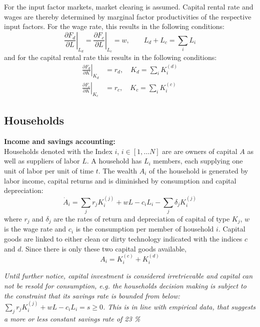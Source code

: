 For the input factor markets, market clearing is assumed. Capital rental rate and wages are thereby determined by marginal factor productivities of the respective input factors.
For the wage rate, this results in the following conditions:
\begin{equation}
	\left. \frac{\partial F_d}{ \partial L} \right|_{L_d} = \left. \frac{\partial F_c}{\partial L}\right|_{L_c} = w, \qquad L_d + L_c = \sum_i L_i
	\label{eq:wage_rage}
\end{equation}
and for the capital rental rate this results in the following conditions:
\begin{align}
	\left. \frac{\partial F_d}{\partial K}\right|_{K_d} &= r_d,\quad K_d = \sum_i K^{(d)}_i \nonumber \\
	\left. \frac{\partial F_c}{\partial K}\right|_{K_c} &= r_c,\quad K_c = \sum_i K^{(c)}_i 
	\label{eq:capital_rental_rate}
\end{align}


\subsection{Households}

\textbf{Income and savings accounting:} \\
Households denoted with the Index $i$, $i \in [1, \dots N]$ are are owners of capital $A$ as well as suppliers of labor $L$. A household has $L_i$ members, each supplying one unit of labor per unit of time $t$. The wealth $A_i$ of the household is generated by labor income, capital returns and is diminished by consumption and capital depreciation:
\begin{equation}
	\dot{A}_i = \sum_j r_j K^{(j)}_{i} + wL -c_{i}L_i - \sum_j \delta_j K^{(j)}_{i}
	\label{eq:household_wealth}
\end{equation}
where $r_j$ and $\delta_j$ are the rates of return and depreciation of capital of type $K_j$, $w$ is the wage rate and $c_i$ is the consumption per member of household $i$. Capital goods are linked to either clean or dirty technology indicated with the indices $c$ and $d$. Since there is only these two capital goods available,
\begin{equation}
	A_i = K^{(c)}_{i} + K^{(d)}_{i}
	\label{eq:household_capital}
\end{equation}

\textit{ Until further notice, capital investment is considered irretrievable and capital can not be resold for consumption, e.g. the households decision making is subject to the constraint that its savings rate is bounded from below: $\sum_j r_j K^{(j)}_{i} + wL -c_{i}L_i = s \ge 0$. This is in line with empirical data, that suggests a more or less constant savings rate of 23 \%} \\

